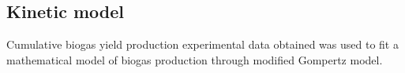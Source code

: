\subsection{Kinetic model}
Cumulative biogas yield production experimental data obtained was used to fit a mathematical model of biogas production through modified Gompertz model.